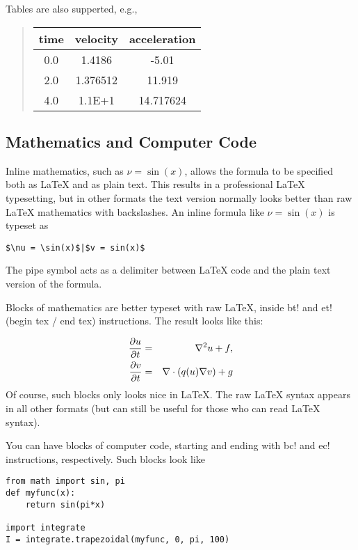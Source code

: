 \documentclass{article}
\begin{document}
Tables are also supperted, e.g.,


\begin{quote}\begin{tabular}{ccc}
\hline
\multicolumn{1}{c}{time} & \multicolumn{1}{c}{velocity} & \multicolumn{1}{c}{acceleration} \\
\hline
0.0          & 1.4186       & -5.01        \\
2.0          & 1.376512     & 11.919       \\
4.0          & 1.1E+1       & 14.717624    \\
\hline
\end{tabular}\end{quote}

\noindent

\subsection*{Mathematics and Computer Code}

Inline mathematics, such as $\nu = \sin(x)$,
allows the formula to be specified both as LaTeX and as plain text.
This results in a professional LaTeX typesetting, but in other formats
the text version normally looks better than raw LaTeX mathematics with
backslashes. An inline formula like $\nu = \sin(x)$ is
typeset as
\begin{Verbatim}[fontsize=\fontsize{9pt}{9pt},tabsize=8,baselinestretch=0.85,
fontfamily=tt,xleftmargin=7mm]
$\nu = \sin(x)$|$v = sin(x)$
\end{Verbatim}
\noindent
The pipe symbol acts as a delimiter between LaTeX code and the plain text
version of the formula.

Blocks of mathematics are better typeset with raw LaTeX, inside
{\fontsize{10pt}{10pt}\verb!!bt!} and {\fontsize{10pt}{10pt}\verb!!et!} (begin tex / end tex) instructions. 
The result looks like this:

\begin{eqnarray}
{\partial u\over\partial t} &=& \nabla^2 u + f,\label{myeq1}\\
{\partial v\over\partial t} &=& \nabla\cdot(q(u)\nabla v) + g
\end{eqnarray}
Of course, such blocks only looks nice in LaTeX. The raw
LaTeX syntax appears in all other formats (but can still be useful
for those who can read LaTeX syntax).

You can have blocks of computer code, starting and ending with
{\fontsize{10pt}{10pt}\verb!!bc!} and {\fontsize{10pt}{10pt}\verb!!ec!} instructions, respectively. Such blocks look like
\begin{Verbatim}[fontsize=\fontsize{9pt}{9pt},tabsize=8,baselinestretch=0.85,
fontfamily=tt,xleftmargin=7mm]
from math import sin, pi
def myfunc(x):
    return sin(pi*x)

import integrate
I = integrate.trapezoidal(myfunc, 0, pi, 100)
\end{Verbatim}
\noindent
\end{document}
